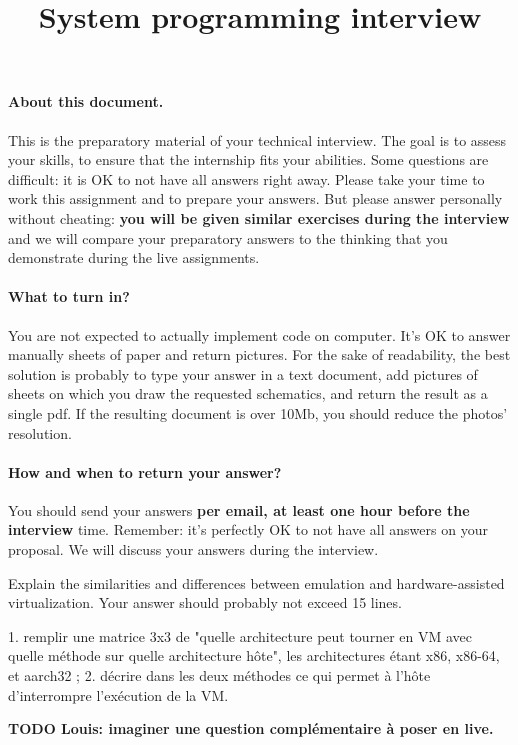 \documentclass[10pt]{article}\usepackage[enonce]{exemptty}
\begin{document}
\title{System programming interview}
\TDmodule{}
\rhead{}
\maketitle

\vspace{-2\baselineskip}
\paragraph{About this document.}
This is the preparatory material of your technical interview. The goal is to
assess your skills, to ensure that the internship fits your abilities. Some
questions are difficult: it is OK to not have all answers right away. Please
take your time to work this assignment and to prepare your answers. But please
answer personally without cheating: \textbf{you will be given similar exercises
  during the interview} and we will compare your preparatory answers to the
thinking that you demonstrate during the live assignments.

\vspace{-.7\baselineskip}
\paragraph{What to turn in?} You are not expected to actually implement code on
computer. It's OK to answer manually sheets of paper and return pictures.
For the sake of readability, the best solution is probably to type your answer
in a text document, add pictures of sheets on which you draw the requested
schematics, and return the result as a single pdf. If the resulting document is
over 10Mb, you should reduce the photos' resolution.

\vspace{-.7\baselineskip}
\paragraph{How and when to return your answer?} You should send your answers \textbf{per
email, at least one hour before the interview} time. Remember: it's perfectly OK
to not have all answers on your proposal. We will discuss your answers during
the interview.

\bigskip
\Exercise Explain the similarities and differences between emulation and
hardware-assisted virtualization. Your answer should probably not exceed 15 lines.

\begin{Reponse}
1. remplir une matrice 3x3 de "quelle architecture peut tourner en VM avec quelle méthode sur quelle architecture hôte", les architectures étant x86, x86-64, et aarch32 ;
2. décrire dans les deux méthodes ce qui permet à l'hôte d'interrompre l'exécution de la VM.

\textbf{\color{red}TODO Louis: imaginer une question complémentaire à poser en live.}  
\end{Reponse}
\end{document}
